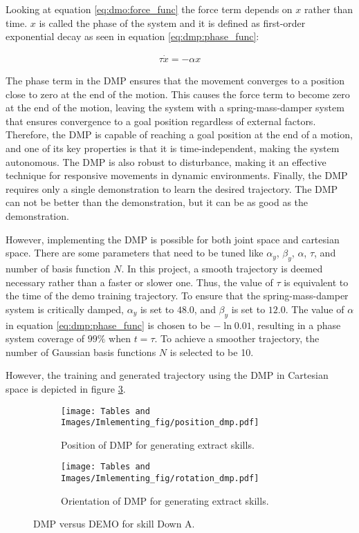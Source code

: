Looking at equation \ref{eq:dmo:force_func} the force term depends on $x$ rather than time. $x$ is called the phase of the system and it is defined as first-order exponential decay as seen in equation \ref{eq:dmp:phase_func}:

\begin{align}
    \tau \Dot{x} = -\alpha x
\label{eq:dmp:phase_func}
\end{align}

The phase term in the DMP ensures that the movement converges to a position close to zero at the end of the motion. This causes the force term to become zero at the end of the motion, leaving the system with a spring-mass-damper system that ensures convergence to a goal position regardless of external factors. Therefore, the DMP is capable of reaching a goal position at the end of a motion, and one of its key properties is that it is time-independent, making the system autonomous. The DMP is also robust to disturbance, making it an effective technique for responsive movements in dynamic environments. Finally, the DMP requires only a single demonstration to learn the desired trajectory. The DMP can not be better than the demonstration, but it can be as good as the demonstration.

However, implementing the DMP is possible for both joint space and cartesian space. There are some parameters that need to be tuned like $\alpha_y$, $\beta_y$, $\alpha$, $\tau$, and number of basis function $N$.
In this project, a smooth trajectory is deemed necessary rather than a faster or slower one. Thus, the value of $\tau$ is equivalent to the time of the demo training trajectory. To ensure that the spring-mass-damper system is critically damped, $\alpha_y $ is set to $48.0$, and $\beta_y$ is set to $12.0$. The value of $\alpha$ in equation \ref {eq:dmp:phase_func} is chosen to be $-\ln{0.01}$, resulting in a phase system coverage of $99\% $ when $t=\tau$. To achieve a smoother trajectory, the number of Gaussian basis functions $N$ is selected to be 10.

However, the training and generated trajectory using the DMP in Cartesian space is depicted in figure \ref{fig:Adm:dmp_both}. 

\begin{figure}[H]
  \centering
  \begin{subfigure}[b]{0.45\linewidth}
    \texttt{[image: Tables and Images/Imlementing\_fig/position\_dmp.pdf]}
    \caption{Position of DMP for generating extract skills.}
    \label{fig:impl:dmp:pos}
  \end{subfigure}
  \hfill
  \begin{subfigure}[b]{0.45\linewidth}
     \texttt{[image: Tables and Images/Imlementing\_fig/rotation\_dmp.pdf]}
    \caption{Orientation of DMP for generating extract skills.}
    \label{fig:impl:dmp:ori}
  \end{subfigure}
  \caption{DMP versus DEMO for skill Down A.}
  \label{fig:Adm:dmp_both}
\end{figure}
\newpage

